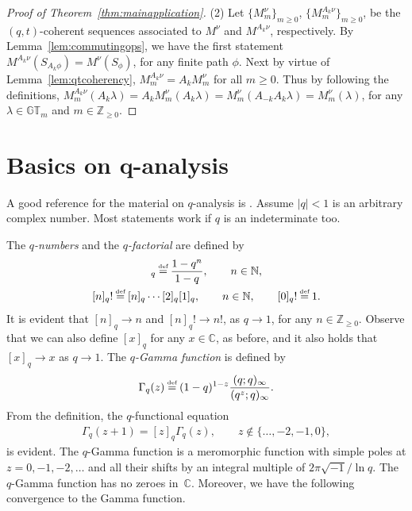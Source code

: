 \documentclass[pdftex]{sigma}
\numberwithin{equation}{section}
\newcommand\myeq{\mathrel{\stackrel{\makebox[0pt]{\mbox{\normalfont\tiny def}}}{=}}}
\newcommand{\C}{\mathbb{C}}
\newcommand{\Z}{\mathbb{Z}}
\newcommand{\N}{\mathbb{N}}
\newcommand{\GT}{\mathbb{GT}}
\begin{document}
\begin{proof}[Proof of Theorem~\ref{thm:mainapplication}]
(2) Let $\{M_m^{\nu}\}_{m \geq 0}$, $\{M_m^{A_k \nu}\}_{m \geq 0}$, be the $(q, t)$-coherent sequences associated to $M^{\nu}$ and $M^{A_k \nu}$, respectively.
By Lemma~\ref{lem:commutingops}, we have the f\/irst statement $M^{A_k\nu}(S_{A_k \phi}) = M^{\nu}(S_{\phi})$, for any f\/inite path $\phi$.
Next by virtue of Lemma~\ref{lem:qtcoherency}, $M^{A_k\nu}_m = A_k M^{\nu}_m$ for all $m\geq 0$.
Thus by following the def\/initions, $M^{A_k\nu}_m (A_k\lambda) = A_k M^{\nu}_m(A_k\lambda) = M^{\nu}_m(A_{-k}A_k \lambda) = M^{\nu}_m(\lambda)$, for any $\lambda\in\GT_m$ and $m\in\Z_{\geq 0}$.
\end{proof}

\appendix

\section[Basics on $q$-analysis]{Basics on $\boldsymbol{q}$-analysis}\label{app:qtheory}


A good reference for the material on $q$-analysis is \cite[Chapter~10]{AAR}. Assume $|q| < 1$ is an arbitrary complex number. Most statements work if $q$ is an indeterminate too.

The \textit{$q$-numbers} and the \textit{$q$-factorial} are def\/ined by
\begin{gather*}
[n]_q \myeq \frac{1 - q^n}{1 - q}, \qquad n\in\N,\\
[n]_q! \myeq [n]_q\cdots[2]_q[1]_q, \qquad n\in\N, \qquad [0]_q! \myeq 1.
\end{gather*}
It is evident that $[n]_q \rightarrow n$ and $[n]_q!\rightarrow n!$, as $q\rightarrow 1$, for any $n\in\Z_{\geq 0}$. Observe that we can also def\/ine $[x]_q$ for any $x\in\C$, as before, and it also holds that $[x]_q \rightarrow x$ as $q\rightarrow 1$. The \textit{$q$-Gamma function} is def\/ined by
\begin{gather*}
\Gamma_q(z) \myeq (1 - q)^{1-z}\frac{(q; q)_{\infty}}{(q^z; q)_{\infty}}.
\end{gather*}
From the def\/inition, the $q$-functional equation
\begin{gather*}
\Gamma_q(z + 1) = [z]_q\Gamma_q(z), \qquad z\notin\{\dots, -2, -1, 0\},
\end{gather*}
is evident. The $q$-Gamma function is a meromorphic function with simple poles at $z = 0, -1, -2, \dots$ and all their shifts by an integral multiple of $2\pi\sqrt{-1}/\ln{q}$.
The $q$-Gamma function has no zeroes in~$\C$. Moreover, we have the following convergence to the Gamma function.
\end{document}

